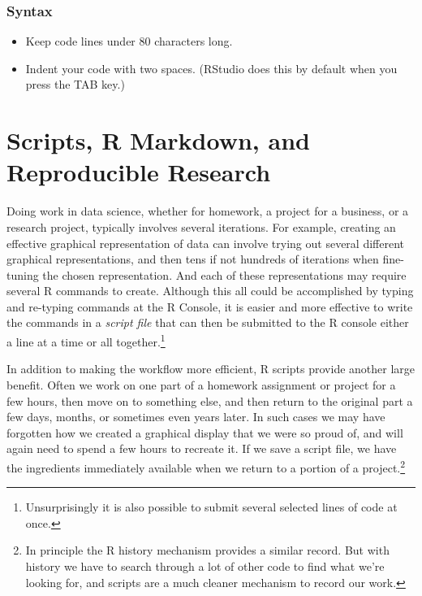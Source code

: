 \documentclass[]{krantz}
\providecommand{\tightlist}{%
  \setlength{\itemsep}{0pt}\setlength{\parskip}{0pt}}
\theoremstyle{definition}
\theoremstyle{definition}
\theoremstyle{definition}
\theoremstyle{remark}
\begin{document}
\subsection{Syntax}\label{syntax}

\begin{itemize}
\tightlist
\item
  Keep code lines under 80 characters long.
\item
  Indent your code with two spaces. (RStudio does this by default when
  you press the TAB key.)
\end{itemize}

\chapter{Scripts, R Markdown, and Reproducible
Research}\label{scripts-r-markdown-and-reproducible-research}

Doing work in data science, whether for homework, a project for a
business, or a research project, typically involves several iterations.
For example, creating an effective graphical representation of data can
involve trying out several different graphical representations, and then
tens if not hundreds of iterations when fine-tuning the chosen
representation. And each of these representations may require several R
commands to create. Although this all could be accomplished by typing
and re-typing commands at the R Console, it is easier and more effective
to write the commands in a \emph{script file} that can then be submitted
to the R console either a line at a time or all together.\footnote{Unsurprisingly
  it is also possible to submit several selected lines of code at once.}

In addition to making the workflow more efficient, R scripts provide
another large benefit. Often we work on one part of a homework
assignment or project for a few hours, then move on to something else,
and then return to the original part a few days, months, or sometimes
even years later. In such cases we may have forgotten how we created a
graphical display that we were so proud of, and will again need to spend
a few hours to recreate it. If we save a script file, we have the
ingredients immediately available when we return to a portion of a
project.\footnote{In principle the R history mechanism provides a
  similar record. But with history we have to search through a lot of
  other code to find what we're looking for, and scripts are a much
  cleaner mechanism to record our work.}
\end{document}
